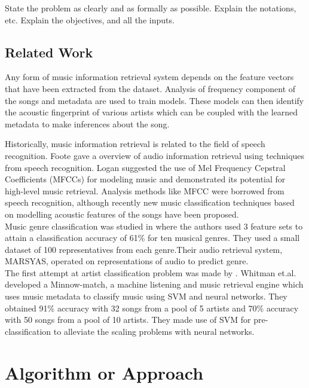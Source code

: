 \documentclass[twocolumn]{article}
\newcommand{\comment}[1]{}
\begin{document}
State the problem as clearly and as formally as possible.
Explain the notations, etc.
Explain the objectives, and all the inputs.

\subsection{Related Work}

Any form of music information retrieval system depends on the feature vectors that have been extracted from the dataset. Analysis of frequency component of the songs and metadata are used to train models. These models can then identify the acoustic fingerprint of various artists which can be coupled with the learned metadata to make inferences about the song.  

Historically, music information retrieval is related to the field of speech recognition. Foote \cite{Foote} gave a overview of audio information retrieval using techniques from speech recognition. Logan \cite{LOGAN} suggested the use of Mel Frequency Cepstral Coefficients (MFCCs) for modeling music and demonstrated its potential for high-level music retrieval. Analysis methods like MFCC were borrowed from speech recognition, although recently new music classification techniques based on modelling acoustic features of the songs have been proposed.\\
Music genre classification was studied in \cite{GTAN} where the authors used 3 feature sets to attain a classification accuracy of 61\% for ten musical genres. They used a small dataset of 100 representatives from each genre.Their audio retrieval system, MARSYAS, operated on representations of audio to predict genre.\\
The first attempt at artist classification problem was made by \cite{BGS}. Whitman et.al.\cite{BGS} developed a Minnow-match, a machine listening and music retrieval engine which uses music metadata to classify music using SVM and neural networks. They obtained 91\% accuracy with 32 songs from a pool of 5 artists and 70\% accuracy with 50 songs from a pool of 10 artists. They made use of SVM for pre-classification to alleviate the scaling problems with neural networks.
\comment{

Can also comment out paragraphs, etc.

}

\section{Algorithm or Approach}
\end{document}
